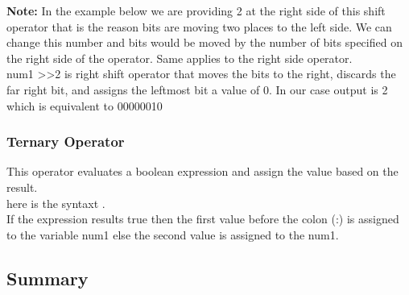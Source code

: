 \documentclass[11pt, a4paper]{article}
\begin{document}
\textbf{Note:} In the example below we are providing 2 at the right side of this shift operator
that is the reason bits are moving two places to the left side. We can change this
number and bits would be moved by the number of bits specified on the right side
of the operator. Same applies to the right side operator.\\
num1 \textgreater\textgreater 2 is right shift operator that moves the bits to the right, discards
the far right bit, and assigns the leftmost bit a value of 0. In our case
output is 2 which is equivalent to 00000010


\subsubsection{Ternary Operator}
This operator evaluates a boolean expression and assign the value based on the result.\\
here is the syntaxt
.\\
If the expression results true then the first value before the colon (:)
is assigned to the variable num1 else the second value is assigned to the num1.


\subsection{Summary}
\end{document}
